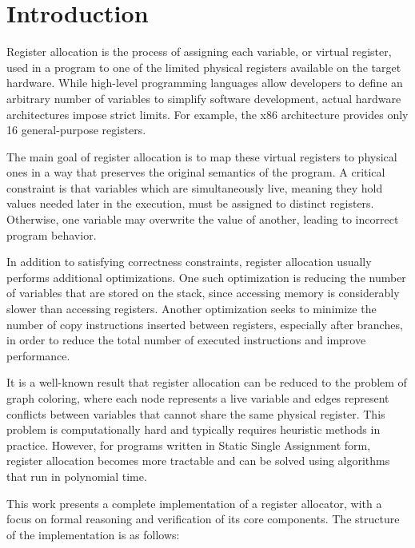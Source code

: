 
\chapter{Introduction}
\label{cha:intro}

Register allocation is the process of assigning each variable, or virtual register, used in a program to one of the limited physical registers available on the target hardware. While high-level programming languages allow developers to define an arbitrary number of variables to simplify software development, actual hardware architectures impose strict limits. For example, the x86 architecture provides only 16 general-purpose registers.

The main goal of register allocation is to map these virtual registers to physical ones in a way that preserves the original semantics of the program. A critical constraint is that variables which are simultaneously live, meaning they hold values needed later in the execution, must be assigned to distinct registers. Otherwise, one variable may overwrite the value of another, leading to incorrect program behavior.

In addition to satisfying correctness constraints, register allocation usually performs additional optimizations. One such optimization is reducing the number of variables that are stored on the stack, since accessing memory is considerably slower than accessing registers. Another optimization seeks to minimize the number of copy instructions inserted between registers, especially after branches, in order to reduce the total number of executed instructions and improve performance.

It is a well-known result that register allocation can be reduced to the problem of graph coloring, where each node represents a live variable and edges represent conflicts between variables that cannot share the same physical register. This problem is computationally hard and typically requires heuristic methods in practice. However, for programs written in Static Single Assignment form, register allocation becomes more tractable and can be solved using algorithms that run in polynomial time.

This work presents a complete implementation of a register allocator, with a focus on formal reasoning and verification of its core components. The structure of the implementation is as follows:

